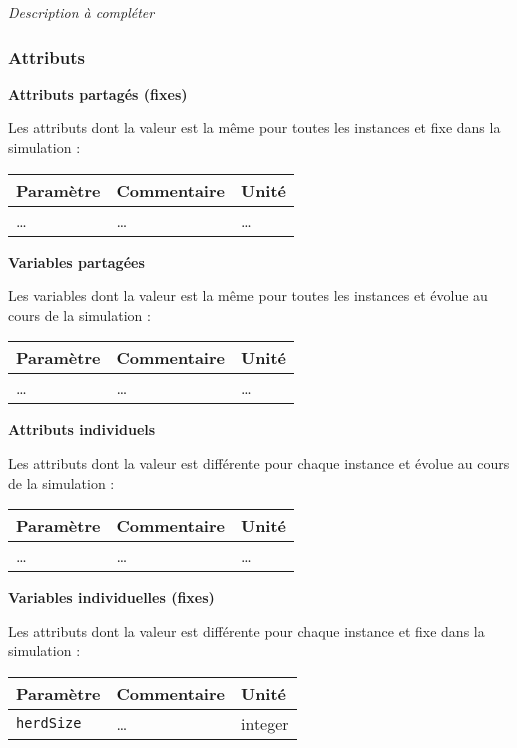 \documentclass[
]{article}
\begin{document}
\emph{Description à compléter}

\subsubsection{Attributs}\label{attributs-5}

\textbf{Attributs partagés (fixes)}

Les attributs dont la valeur est la même pour toutes les instances et
fixe dans la simulation :

\begin{longtable}[]{@{}lll@{}}
\toprule\noalign{}
\textbf{Paramètre} & \textbf{Commentaire} & \textbf{Unité} \\
\midrule\noalign{}
\endhead
\bottomrule\noalign{}
\endlastfoot
\ldots{} & \ldots{} & \ldots{} \\
\end{longtable}

\textbf{Variables partagées}

Les variables dont la valeur est la même pour toutes les instances et
évolue au cours de la simulation :

\begin{longtable}[]{@{}lll@{}}
\toprule\noalign{}
\textbf{Paramètre} & \textbf{Commentaire} & \textbf{Unité} \\
\midrule\noalign{}
\endhead
\bottomrule\noalign{}
\endlastfoot
\ldots{} & \ldots{} & \ldots{} \\
\end{longtable}

\textbf{Attributs individuels}

Les attributs dont la valeur est différente pour chaque instance et
évolue au cours de la simulation :

\begin{longtable}[]{@{}lll@{}}
\toprule\noalign{}
\textbf{Paramètre} & \textbf{Commentaire} & \textbf{Unité} \\
\midrule\noalign{}
\endhead
\bottomrule\noalign{}
\endlastfoot
\ldots{} & \ldots{} & \ldots{} \\
\end{longtable}

\textbf{Variables individuelles (fixes)}

Les attributs dont la valeur est différente pour chaque instance et fixe
dans la simulation :

\begin{longtable}[]{@{}lll@{}}
\toprule\noalign{}
\textbf{Paramètre} & \textbf{Commentaire} & \textbf{Unité} \\
\midrule\noalign{}
\endhead
\bottomrule\noalign{}
\endlastfoot
\texttt{herdSize} & \ldots{} & integer \\
\end{longtable}
\end{document}
